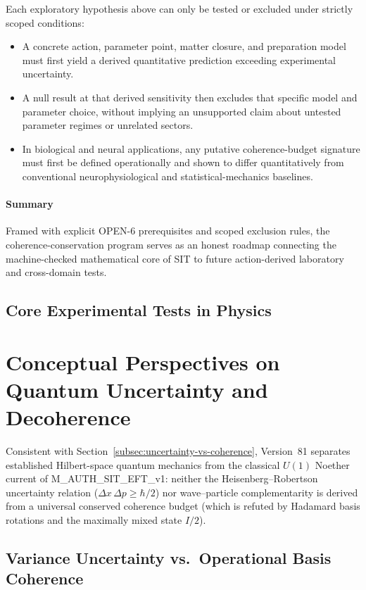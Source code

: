 \documentclass[american,11pt,letterpaper]{article}
\def\texttt#1{#1}%
\begin{document}
Each exploratory hypothesis above can only be tested or excluded under strictly scoped conditions:
\begin{itemize}
    \item A concrete action, parameter point, matter closure, and preparation model must first yield a derived quantitative prediction exceeding experimental uncertainty.
    \item A null result at that derived sensitivity then excludes that specific model and parameter choice, without implying an unsupported claim about untested parameter regimes or unrelated sectors.
    \item In biological and neural applications, any putative coherence-budget signature must first be defined operationally and shown to differ quantitatively from conventional neurophysiological and statistical-mechanics baselines.
\end{itemize}

\paragraph{Summary}

Framed with explicit \texttt{OPEN-6} prerequisites and scoped exclusion rules, the coherence-conservation program serves as an honest roadmap connecting the machine-checked mathematical core of SIT to future action-derived laboratory and cross-domain tests.

\subsection{Core Experimental Tests in Physics}

\section{Conceptual Perspectives on Quantum Uncertainty and Decoherence}
\label{sec:quantum_reinterpret}

Consistent with Section~\ref{subsec:uncertainty-vs-coherence}, Version~81 separates established Hilbert-space quantum mechanics from the classical $U(1)$ Noether current of \texttt{M\_AUTH\_SIT\_EFT\_v1}: neither the Heisenberg--Robertson uncertainty relation ($\Delta x\,\Delta p \ge \hbar/2$) nor wave--particle complementarity is derived from a universal conserved coherence budget (which is refuted by Hadamard basis rotations and the maximally mixed state $I/2$).

\subsection{Variance Uncertainty vs.\ Operational Basis Coherence}
\end{document}
